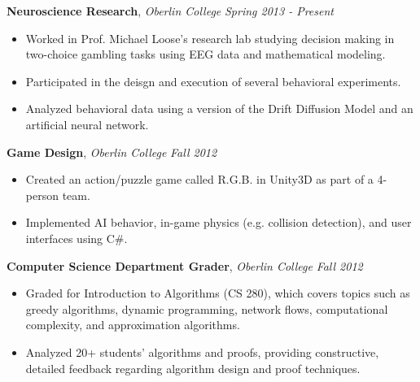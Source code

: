\documentclass[9pt]{article}
\newenvironment{changemargin}[2]{%
  \begin{list}{}{%
    \setlength{\topsep}{0pt}%
    \setlength{\leftmargin}{#1}%
    \setlength{\rightmargin}{#2}%
    \setlength{\listparindent}{\parindent}%
    \setlength{\itemindent}{\parindent}%
    \setlength{\parsep}{\parskip}%
  }%
  \item[]}{\end{list}
}
\newenvironment{body} {
	\vspace*{-16pt}
	\begin{changemargin}{-0.25in}{-0.5in}
  }	
	{\end{changemargin}
}
\begin{document}
\begin{body}
	\textbf{Neuroscience Research}, \emph{Oberlin College} \hfill \emph{Spring 2013 - Present}\\
	\vspace*{-4pt}
	\begin{itemize} \itemsep -0pt  %
		\item Worked in Prof. Michael Loose's research lab studying decision making in two-choice gambling tasks using EEG data and mathematical modeling.
		\item Participated in the deisgn and execution of several behavioral experiments.
		\item Analyzed behavioral data using a version of the Drift Diffusion Model and an artificial neural network.
	\end{itemize}


	\textbf{Game Design}, \emph{Oberlin College} \hfill \emph{Fall 2012}\\
	\vspace*{-4pt}
	\begin{itemize} \itemsep -0pt  %
		\item Created an action/puzzle game called R.G.B. in Unity3D as part of a 4-person team.
		\item Implemented AI behavior, in-game physics (e.g. collision detection), and user interfaces using C\#.
	\end{itemize}

	\textbf{Computer Science Department Grader}, \emph{Oberlin College} \hfill \emph{Fall 2012}\\
	\vspace*{-4pt}
	\begin{itemize} \itemsep -0pt  %
		\item Graded for Introduction to Algorithms (CS 280), which covers topics such as greedy algorithms, dynamic programming, network flows, computational complexity, and approximation algorithms.
		\item Analyzed 20+ students' algorithms and proofs, providing constructive, detailed feedback regarding algorithm design and proof techniques.
	\end{itemize}
\end{body}
\end{document}
